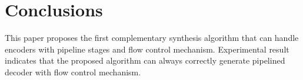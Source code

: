\documentclass[conference]{IEEEtran}
\begin{document}
\section{Conclusions}\label{sec_conclude}
This paper proposes the first complementary synthesis algorithm that
can handle encoders with pipeline stages and flow control mechanism.
Experimental result indicates that the proposed algorithm can always 
correctly generate pipelined decoder with flow control mechanism.





% 
% 

% 
% 







\end{document}
